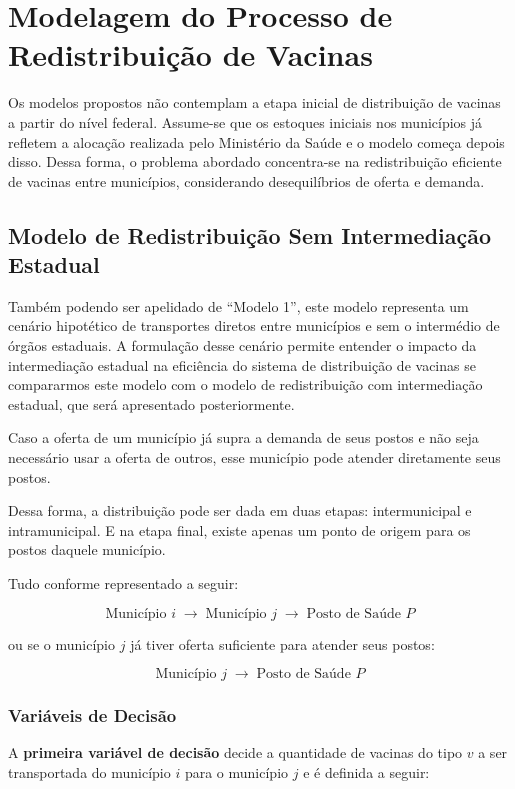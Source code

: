 \chapter{Modelagem do Processo de Redistribuição de Vacinas}

Os modelos propostos não contemplam a etapa inicial de distribuição de vacinas a partir do nível federal. Assume-se que os estoques iniciais nos municípios já refletem a alocação realizada pelo Ministério da Saúde e o modelo começa depois disso. Dessa forma, o problema abordado concentra-se na redistribuição eficiente de vacinas entre municípios, considerando desequilíbrios de oferta e demanda.

\section{Modelo de Redistribuição Sem Intermediação Estadual}

Também podendo ser apelidado de ``Modelo 1'', este modelo representa um cenário hipotético de transportes diretos entre municípios e sem o intermédio de órgãos estaduais. A formulação desse cenário permite entender o impacto da intermediação estadual na eficiência do sistema de distribuição de vacinas se compararmos este modelo com o modelo de redistribuição com intermediação estadual, que será apresentado posteriormente.

Caso a oferta de um município já supra a demanda de seus postos e não seja necessário usar a oferta de outros, esse município pode atender diretamente seus postos.

Dessa forma, a distribuição pode ser dada em duas etapas: intermunicipal e intramunicipal. E na etapa final, existe apenas um ponto de origem para os postos daquele município. 

Tudo conforme representado a seguir:

\[
\text{Município } i \;\longrightarrow\; \text{Município } j \;\longrightarrow\; \text{Posto de Saúde } P
\]

ou se o município $j$ já tiver oferta suficiente para atender seus postos:

\[
\text{Município } j \;\longrightarrow\; \text{Posto de Saúde } P
\]

\subsection{Variáveis de Decisão}

A \textbf{primeira variável de decisão} decide a quantidade de vacinas do tipo $v$ a ser transportada do município $i$ para o município $j$ e é definida a seguir:


